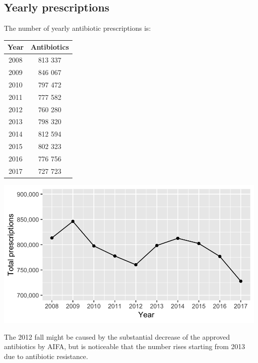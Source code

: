 \subsection{Yearly prescriptions}
The number of yearly antibiotic prescriptions is:
\begin{table}[!htb]
	\centering
	\parbox{0.25\textwidth}{
		\begin{footnotesize}
			\begin{tabular}{|c|c|}
				\hline
				Year & Antibiotics \\
				\hline
				2008 & 813 337 \\
				\hline
				2009 & 846 067 \\
				\hline
				2010 & 797 472 \\
				\hline
				2011 & 777 582 \\
				\hline
				2012 & 760 280 \\
				\hline
				2013 & 798 320 \\
				\hline
				2014 & 812 594 \\
				\hline
				2015 & 802 323 \\
				\hline
				2016 & 776 756 \\
				\hline
				2017 & 727 723 \\
				\hline
			\end{tabular}
		\end{footnotesize}
	}
	\qquad
	\begin{minipage}[c]{0.6\textwidth}
		\centering
		\includegraphics[width=1\textwidth]{../plots/yearly_prescriptions.png}
	\end{minipage}
\end{table}

The 2012 fall might be caused by the substantial decrease of the approved antibiotics by AIFA\cite{calo}, but is noticeable that the number rises starting from 2013 due to antibiotic resistance. 

